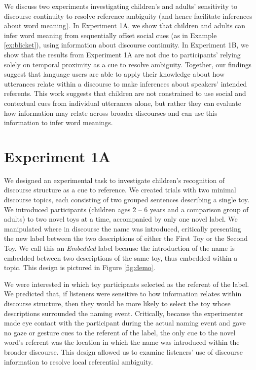 \documentclass[man]{apa2}
\begin{document}
We discuss two experiments investigating children's and adults' sensitivity to discourse continuity to resolve reference ambiguity (and hence facilitate inferences about word meaning). In Experiment 1A, we show that children and adults can infer word meaning from sequentially offset social cues (as in Example \ref{ex:blicket}), using information about discourse continuity.  In Experiment 1B, we show that the results from Experiment 1A are not due to participants' relying solely on temporal proximity as a cue to resolve ambiguity.  Together, our findings suggest that language users are able to apply their knowledge about how utterances relate within a discourse to make inferences about speakers' intended referents.  This work suggests that children are not constrained to use social and contextual cues from individual utterances alone, but rather they can evaluate how information may relate across broader discourses and can use this information to infer word meanings.

\section{Experiment 1A}

We designed an experimental task to investigate children's recognition of discourse structure as a cue to reference. We created trials with two minimal discourse topics, each consisting of two grouped sentences describing a single toy.  We introduced participants (children ages 2 -- 6 years and a comparison group of adults) to two novel toys at a time, accompanied by only one novel label.  We manipulated where in discourse the name was introduced, critically presenting the new label between the two descriptions of either the First Toy or the Second Toy.  We call this an \emph{Embedded} label because the introduction of the name is embedded between two descriptions of the same toy, thus embedded within a topic.  This design is pictured in Figure \ref{fig:demo}.

We were interested in which toy participants selected as the referent of the label.  We predicted that, if listeners were sensitive to how information relates within discourse structure, then they would be more likely to select the toy whose descriptions surrounded the naming event.  Critically, because the experimenter made eye contact with the participant during the actual naming event and gave no gaze or gesture cues to the referent of the label, the only cue to the novel word's referent was the location in which the name was introduced within the broader discourse.  This design allowed us to examine listeners' use of discourse information to resolve local referential ambiguity.  
\end{document}
